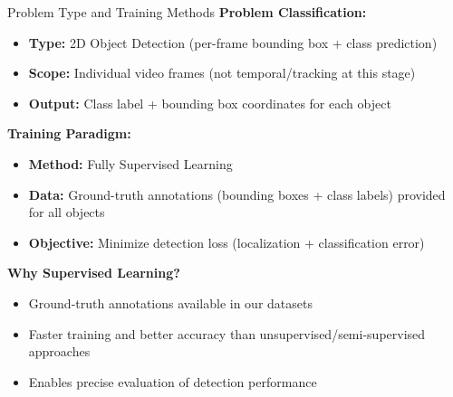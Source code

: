 \documentclass{beamer}
\begin{document}
\begin{frame}{Problem Type and Training Methods}
    \textbf{Problem Classification:}
    \begin{itemize}
        \item \textbf{Type:} 2D Object Detection (per-frame bounding box + class prediction)
        \item \textbf{Scope:} Individual video frames (not temporal/tracking at this stage)
        \item \textbf{Output:} Class label + bounding box coordinates for each object
    \end{itemize}

    \vspace{0.3cm}
    \textbf{Training Paradigm:}
    \begin{itemize}
        \item \textbf{Method:} Fully Supervised Learning
        \item \textbf{Data:} Ground-truth annotations (bounding boxes + class labels) provided for all objects
        \item \textbf{Objective:} Minimize detection loss (localization + classification error)
    \end{itemize}

    \vspace{0.3cm}
    \textbf{Why Supervised Learning?}
    \begin{itemize}
        \item Ground-truth annotations available in our datasets
        \item Faster training and better accuracy than unsupervised/semi-supervised approaches
        \item Enables precise evaluation of detection performance
    \end{itemize}
\end{frame}
\end{document}
